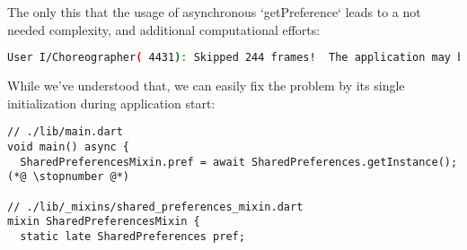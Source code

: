 \noindent The only this that the usage of asynchronous `getPreference` leads to a not needed complexity, and 
additional computational efforts:

\begin{lstlisting}[language=bash]
User I/Choreographer( 4431): Skipped 244 frames!  The application may be doing too much work on its main thread.
\end{lstlisting}

\noindent While we've understood that, we can easily fix the problem by its single initialization during
application start:

\begin{lstlisting}
// ./lib/main.dart
void main() async {
  SharedPreferencesMixin.pref = await SharedPreferences.getInstance();(*@ \stopnumber @*)

// ./lib/_mixins/shared_preferences_mixin.dart
mixin SharedPreferencesMixin {
  static late SharedPreferences pref;
\end{lstlisting}
